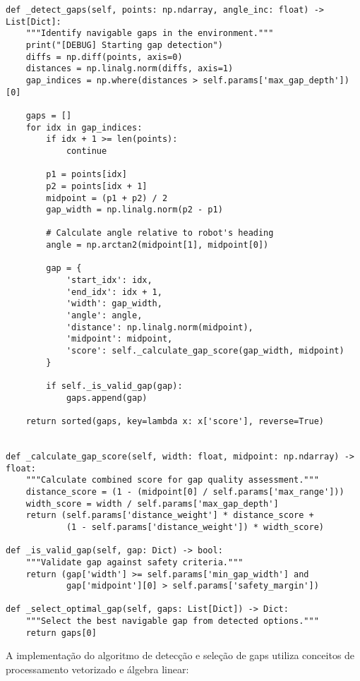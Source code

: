 \begin{verbatim}
def _detect_gaps(self, points: np.ndarray, angle_inc: float) -> List[Dict]:
    """Identify navigable gaps in the environment."""
    print("[DEBUG] Starting gap detection")
    diffs = np.diff(points, axis=0)
    distances = np.linalg.norm(diffs, axis=1)
    gap_indices = np.where(distances > self.params['max_gap_depth'])[0]
    
    gaps = []
    for idx in gap_indices:
        if idx + 1 >= len(points):
            continue
            
        p1 = points[idx]
        p2 = points[idx + 1]
        midpoint = (p1 + p2) / 2
        gap_width = np.linalg.norm(p2 - p1)
        
        # Calculate angle relative to robot's heading
        angle = np.arctan2(midpoint[1], midpoint[0])
        
        gap = {
            'start_idx': idx,
            'end_idx': idx + 1,
            'width': gap_width,
            'angle': angle,
            'distance': np.linalg.norm(midpoint),
            'midpoint': midpoint,
            'score': self._calculate_gap_score(gap_width, midpoint)
        }
        
        if self._is_valid_gap(gap):
            gaps.append(gap)
            
    return sorted(gaps, key=lambda x: x['score'], reverse=True)


def _calculate_gap_score(self, width: float, midpoint: np.ndarray) -> float:
    """Calculate combined score for gap quality assessment."""
    distance_score = (1 - (midpoint[0] / self.params['max_range']))
    width_score = width / self.params['max_gap_depth']
    return (self.params['distance_weight'] * distance_score +
            (1 - self.params['distance_weight']) * width_score)

def _is_valid_gap(self, gap: Dict) -> bool:
    """Validate gap against safety criteria."""
    return (gap['width'] >= self.params['min_gap_width'] and
            gap['midpoint'][0] > self.params['safety_margin'])

def _select_optimal_gap(self, gaps: List[Dict]) -> Dict:
    """Select the best navigable gap from detected options."""
    return gaps[0]
\end{verbatim}

A implementação do algoritmo de detecção e seleção de gaps utiliza conceitos de
processamento vetorizado e álgebra linear:

